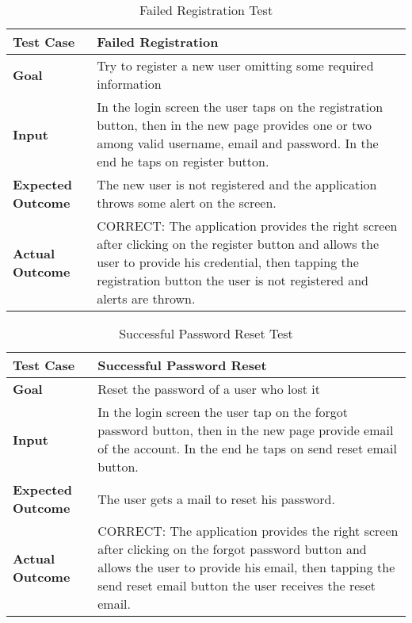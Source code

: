 \begin{table}[H]
	\centering
	\begin{tabular}{|l|l|}
	\hline
	\textbf{Test Case}& Failed Registration\\
	\hline
	\textbf{Goal}& Try to register a new user omitting some required information\\
	\hline
	\textbf{Input}& 
	\begin{minipage}{.7\linewidth}
	In the login screen the user taps on the registration button, then in the new page provides one or two among valid username, email and password. In the end he taps on register button.
	\end{minipage}\\
	\hline
	\textbf{Expected Outcome}&
	\begin{minipage}{.7\linewidth}
	The new user is not registered and the application throws some alert on the screen.
	\end{minipage}\\
	\hline
	\textbf{Actual Outcome}& 
	\begin{minipage}{.7\linewidth}
	CORRECT: The application provides the right screen after clicking on the register button and allows the user to provide his credential, then tapping the registration button the user is not registered and alerts are thrown.
	\end{minipage}\\
	\hline	
	\end{tabular}
	\caption{Failed Registration Test}
\end{table}

\begin{table}[H]
	\centering
	\begin{tabular}{|l|l|}
	\hline
	\textbf{Test Case}& Successful Password Reset\\
	\hline
	\textbf{Goal}& Reset the password of a user who lost it\\
	\hline
	\textbf{Input}& 
	\begin{minipage}{.7\linewidth}
	In the login screen the user tap on the forgot password button, then in the new page provide email of the account. In the end he taps on send reset email button.
	\end{minipage}\\
	\hline
	\textbf{Expected Outcome}& The user gets a mail to reset his password.\\
	\hline
	\textbf{Actual Outcome}& 
	\begin{minipage}{.7\linewidth}
	CORRECT: The application provides the right screen after clicking on the forgot password button and allows the user to provide his email, then tapping the send reset email button the user receives the reset email.
	\end{minipage}\\
	\hline	
	\end{tabular}
	\caption{Successful Password Reset Test}
\end{table}


